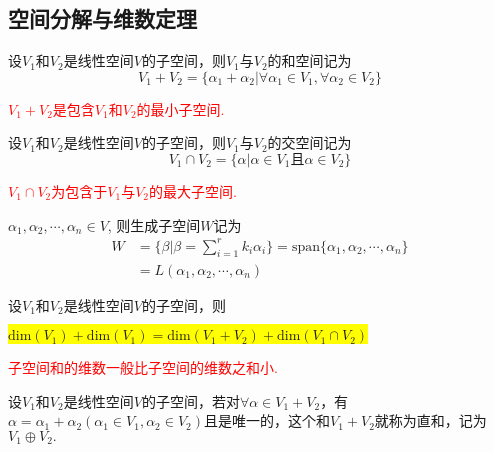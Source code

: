 \subsection{空间分解与维数定理}

\begin{definition}[和空间]
	设$V_1$和$V_2$是线性空间$V$的子空间，则$V_1$与$V_2$的和空间记为
	\[
	V_1+V_2=\{\alpha_1+\alpha_2|\forall\alpha_1\in V_1, \forall\alpha_2\in V_2\}
	\]
\end{definition}

\begin{note}
	\textcolor{red}{$V_1+V_2$是包含$V_1$和$V_2$的最小子空间.}
\end{note}

\begin{definition}[交空间]
	设$V_1$和$V_2$是线性空间$V$的子空间，则$V_1$与$V_2$的交空间记为
	\[
	V_1\cap V_2=\{\alpha|\alpha\in V_1\mbox{且} \alpha\in V_2\}
	\]
\end{definition}

\begin{note}
	\textcolor{red}{$V_1\cap V_2$为包含于$V_1$与$V_2$的最大子空间.}
\end{note}

\begin{definition}[生成子空间]
	$\alpha_1,\alpha_2,\cdots,\alpha_n \in V$, 则生成子空间$W$记为
	\[
	\begin{split}
		W&=\{\beta|\beta=\sum_{i=1}^{r}k_i\alpha_i\}=\mathrm{span}\{\alpha_1,\alpha_2,\cdots,\alpha_n\}\\
		&=L(\alpha_1,\alpha_2,\cdots,\alpha_n)
	\end{split}
	\]
\end{definition}

\begin{theorem}
设$V_1$和$V_2$是线性空间$V$的子空间，则

\centering\colorbox{yellow}{$
\mathrm{dim}(V_1)+\mathrm{dim}(V_1)=\mathrm{dim}(V_1+V_2)+\mathrm{dim}(V_1\cap V_2)$}
\end{theorem}


\begin{note}
	\textcolor{red}{子空间和的维数一般比子空间的维数之和小.}
\end{note}

\begin{definition}
	设$V_1$和$V_2$是线性空间$V$的子空间，若对$\forall \alpha\in V_1+V_2$，有$\alpha=\alpha_1+\alpha_2(\alpha_1 \in V_1, \alpha_2 \in V_2)$且是唯一的，这个和$V_1+V_2$就称为直和，记为$V_1\oplus V_2.$
\end{definition}

